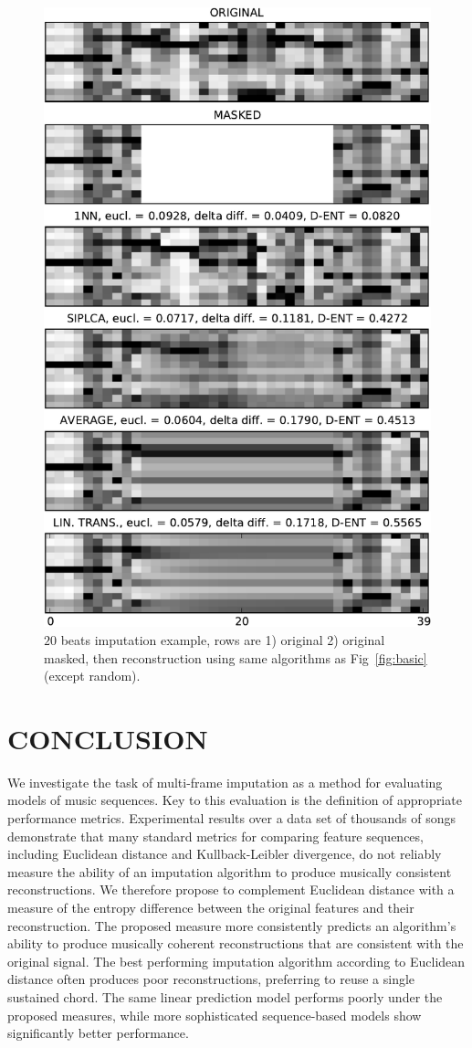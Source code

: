 \documentclass{article}
\begin{document}
\begin{figure}[t]
\begin{center}
\includegraphics[width=.70\columnwidth]{basic3}
\end{center}
\caption{$20$ beats imputation example, rows are 1) original 2) original masked,
then reconstruction using same algorithms as Fig~\ref{fig:basic} (except random).
\label{fig:basic3}}
\end{figure}

\section{CONCLUSION} %
\label{sec:conclusion}

We investigate the task of multi-frame imputation as a method for
evaluating models of music sequences.  
%
Key to this evaluation is the definition of appropriate performance
metrics.  
%
Experimental results over a data set of thousands of songs demonstrate
that many standard metrics for comparing feature sequences, including
Euclidean distance and Kullback-Leibler divergence, do not reliably
measure the ability of an imputation algorithm to produce musically
consistent reconstructions.  We therefore propose to complement
Euclidean distance with a measure of the entropy difference between
the original features and their reconstruction.
%
The proposed measure more consistently predicts an algorithm's ability
to produce musically coherent reconstructions that are consistent with
the original signal.
%
The best performing imputation algorithm according to Euclidean
distance often produces poor reconstructions, preferring to reuse a
single sustained chord.  The same linear prediction model performs
poorly under the proposed measures, while more sophisticated
sequence-based models show significantly better performance. 
\end{document}
